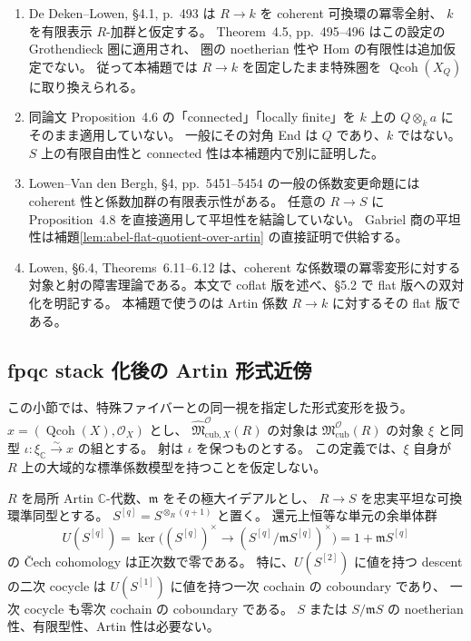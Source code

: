 \begin{remark}[一次文献の正確な適用範囲]
\begin{enumerate}
\item De Deken--Lowen, \S4.1, p.~493 は $R\to k$ を coherent 可換環の冪零全射、
$k$ を有限表示 $R$-加群と仮定する。
Theorem~4.5, pp.~495--496 はこの設定の Grothendieck 圏に適用され、
圏の noetherian 性や Hom の有限性は追加仮定でない。
従って本補題では $R\to k$ を固定したまま特殊圏を
$\operatorname{Qcoh}(X_Q)$ に取り換えられる。
\item 同論文 Proposition~4.6 の「connected」「locally finite」を
$k$ 上の $Q\otimes_ka$ にそのまま適用していない。
一般にその対角 End は $Q$ であり、$k$ ではない。
$S$ 上の有限自由性と connected 性は本補題内で別に証明した。
\item Lowen--Van den Bergh, \S4, pp.~5451--5454 の一般の係数変更命題には
coherent 性と係数加群の有限表示性がある。
任意の $R\to S$ に Proposition~4.8 を直接適用して平坦性を結論していない。
Gabriel 商の平坦性は補題\ref{lem:abel-flat-quotient-over-artin} の直接証明で供給する。
\item Lowen, \S6.4, Theorems~6.11--6.12 は、coherent な係数環の冪零変形に対する
対象と射の障害理論である。本文で coflat 版を述べ、\S5.2 で flat 版への双対化を明記する。
本補題で使うのは Artin 係数 $R\to k$ に対するその flat 版である。
\end{enumerate}
\end{remark}

\subsection{fpqc stack 化後の Artin 形式近傍}

この小節では、特殊ファイバーとの同一視を指定した形式変形を扱う。
$x=(\operatorname{Qcoh}(X),\mathcal O_X)$ とし、
$\widehat{\mathfrak M}^{\mathcal O}_{\mathrm{cub},X}(R)$ の対象は
$\mathfrak M^{\mathcal O}_{\mathrm{cub}}(R)$ の対象 $\xi$ と同型
$\iota:\xi_{\mathbb C}\xrightarrow{\sim}x$ の組とする。
射は $\iota$ を保つものとする。
この定義では、$\xi$ 自身が $R$ 上の大域的な標準係数模型を持つことを仮定しない。

\begin{lemma}
\label{lem:abel-unipotent-amitsur}
$R$ を局所 Artin $\mathbb C$-代数、$\mathfrak m$ をその極大イデアルとし、
$R\to S$ を忠実平坦な可換環準同型とする。
$S^{[q]}=S^{\otimes_R(q+1)}$ と置く。
還元上恒等な単元の余単体群
\[
 U(S^{[q]})=
 \ker\bigl((S^{[q]})^\times\longrightarrow
          (S^{[q]}/\mathfrak mS^{[q]})^\times\bigr)
 =1+\mathfrak mS^{[q]}
\]
の \v{C}ech cohomology は正次数で零である。
特に、$U(S^{[2]})$ に値を持つ descent の二次 cocycle は
$U(S^{[1]})$ に値を持つ一次 cochain の coboundary であり、
一次 cocycle も零次 cochain の coboundary である。
$S$ または $S/\mathfrak mS$ の noetherian 性、有限型性、Artin 性は必要ない。
\end{lemma}

